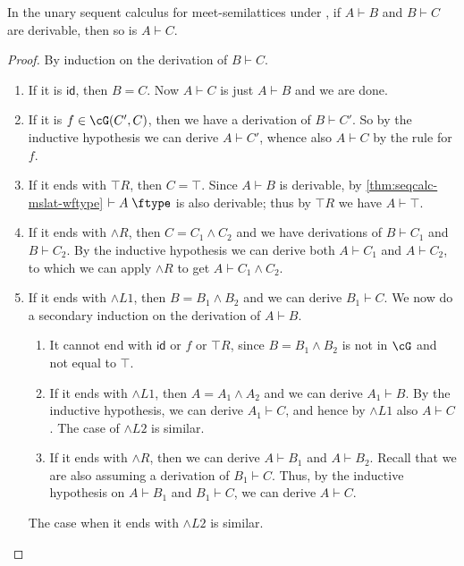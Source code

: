\documentclass{book}
\def\idfunc{\mathsf{id}}
\let\types\vdash
\def\type{\;\ftype}
\let\meet\wedge
\def\meetL{\mathord{\meet}L}
\def\meetR{\mathord{\meet}R}
\begin{document}
\begin{thm}\label{thm:seqcalc-mslat-cutadm}
  In the unary sequent calculus for meet-semilattices under \cG, if $A\types B$ and $B\types C$ are derivable, then so is $A\types C$.
\end{thm}
\begin{proof}
  By induction on the derivation of $B\types C$.
  \begin{enumerate}
  \item If it is $\idfunc$, then $B=C$.
    Now $A\types C$ is just $A\types B$ and we are done.
  \item If it is $f\in\cG(C',C)$, then we have a derivation of $B\types C'$.
    So by the inductive hypothesis we can derive $A\types C'$, whence also $A\types C$ by the rule for $f$.
  \item If it ends with $\top R$, then $C=\top$.
    Since $A\types B$ is derivable, by \cref{thm:seqcalc-mslat-wftype} $\types A\type$ is also derivable; thus by $\top R$ we have $A\types \top$.
  \item If it ends with $\meetR$, then $C=C_1\meet C_2$ and we have derivations of $B\types C_1$ and $B\types C_2$.
    By the inductive hypothesis we can derive both $A\types C_1$ and $A\types C_2$, to which we can apply $\meetR$ to get $A\types C_1\meet C_2$.
  \item If it ends with $\meetL1$, then $B=B_1\meet B_2$ and we can derive $B_1\types C$.
    We now do a secondary induction on the derivation of $A\types B$.
    \begin{enumerate}
    \item It cannot end with $\idfunc$ or $f$ or $\top R$, since $B=B_1\meet B_2$ is not in $\cG$ and not equal to $\top$.
    \item If it ends with $\meetL1$, then $A=A_1\meet A_2$ and we can derive $A_1\types B$.
      By the inductive hypothesis, we can derive $A_1 \types C$, and hence by $\meetL1$ also $A \types C$.
      The case of $\meetL2$ is similar.
    \item If it ends with $\meetR$, then we can derive $A\types B_1$ and $A\types B_2$.
      Recall that we are also assuming a derivation of $B_1\types C$.
      Thus, by the inductive hypothesis on $A\types B_1$ and $B_1\types C$, we can derive $A\types C$.
      \label{item:mslat-principal-cut}\qedhere
    \end{enumerate}
    The case when it ends with $\meetL2$ is similar.
  \end{enumerate}
\end{proof}
\end{document}
